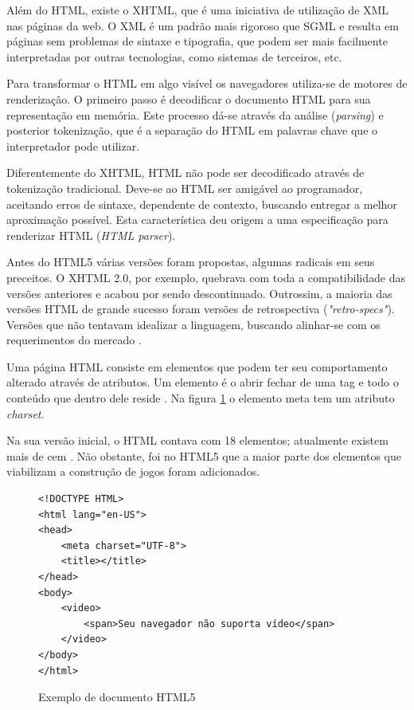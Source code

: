 \documentclass[
12pt,
a4paper,
portuges,
draft
]{report}
\begin{document}
Além do HTML, existe o XHTML, que é uma iniciativa de utilização
de XML nas páginas da web. O XML é um padrão mais rigoroso que SGML
e resulta em páginas sem problemas de sintaxe e tipografia, 
que podem ser mais facilmente interpretadas por
outras tecnologias, como sistemas de terceiros, etc.

Para transformar o HTML em algo visível os navegadores utiliza-se
de motores de renderização. O primeiro passo é decodificar o documento HTML
para sua representação em memória. Este processo dá-se através
da análise (\textit{parsing}) e posterior tokenização, que é a separação
do HTML em palavras chave que o interpretador pode utilizar.

Diferentemente do XHTML, HTML não pode ser decodificado através de
tokenização tradicional. Deve-se ao HTML ser amigável ao programador,
aceitando erros de sintaxe, dependente de contexto, buscando entregar a
melhor aproximação possível. Esta característica deu origem a uma
especificação para renderizar HTML (\textit{HTML parser}).

Antes do HTML5 várias versões foram propostas, algumas radicais
em seus preceitos. O XHTML 2.0, por exemplo, quebrava com toda
a compatibilidade das versões anteriores e acabou por sendo descontinuado.
Outrossim, a maioria das versões HTML de grande sucesso foram versões de
retrospectiva (\textit{"retro-specs"}). Versões que não tentavam
idealizar a linguagem, buscando alinhar-se com os requerimentos do
mercado \autocite{diveIntohtml}.

Uma página HTML consiste em elementos que podem ter seu comportamento
alterado através de atributos. Um elemento é o abrir fechar de
uma tag e todo o conteúdo que dentro dele reside \autocite[pp.
10--11]{htmlAndCssDucket}. Na figura \ref{fig:htmlSample} o elemento
meta tem um atributo \textit{charset}.

Na sua versão inicial, o HTML contava com 18 elementos;
atualmente existem mais de cem \autocite{diveIntohtml}.
Não obstante, foi no HTML5 que a maior parte dos elementos
que viabilizam a construção de jogos foram adicionados.

\begin{figure}
\centering
\begin{verbatim}
<!DOCTYPE HTML>
<html lang="en-US">
<head>
	<meta charset="UTF-8">
	<title></title>
</head>
<body>
    <video>
        <span>Seu navegador não suporta vídeo</span>
    </video>
</body>
</html>
\end{verbatim}
\caption{Exemplo de documento HTML5}
\label{fig:htmlSample}
\end{figure}
\end{document}
